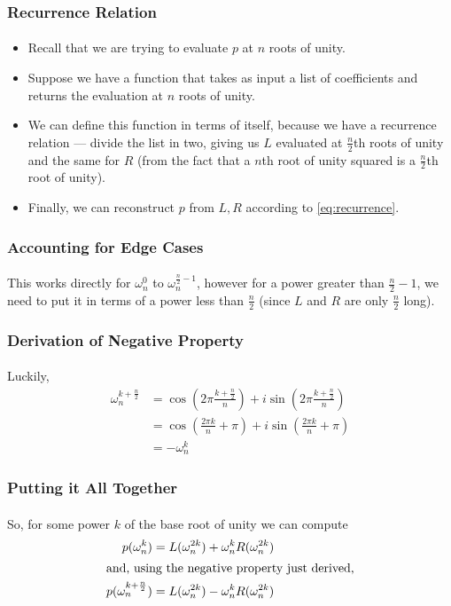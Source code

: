 \documentclass{beamer}                             %
\begin{document}
\begin{frame}
\frametitle{Recurrence Relation}
\framesubtitle{}
\begin{itemize}[<+->]
  \item Recall that we are trying to evaluate
    \( p \) at \( n \) roots of unity.
  \item Suppose we have a function that takes as input a list of
    coefficients and returns the evaluation at \( n \) roots of unity.
  \item We can define this function in terms of itself, because we
    have a recurrence relation --- divide the list in two, giving us
    \( L \) evaluated at \( \frac{n}{2} \)th roots of unity and the
    same for \( R \) (from the fact that a \( n \)th root of unity
    squared is a \( \frac{n}{2} \)th root of unity).
  \item Finally, we can reconstruct \( p \) from
    \( L, R \) according to \eqref{eq:recurrence}.
\end{itemize}
\end{frame}

\begin{frame}
\frametitle{Accounting for Edge Cases}
\framesubtitle{}
This works directly for \( \omega^0_n \) to \( \omega^{\frac{n}{2} - 1}_n \),
however for a power greater than \( \frac{n}{2} - 1 \), we need to put it in
terms of a power less than \( \frac{n}{2} \) (since \( L \) and \( R \) are
only \( \frac{n}{2} \) long).
\end{frame}

\begin{frame}
\frametitle{Derivation of Negative Property}
\framesubtitle{}
Luckily, 
\begin{align*}
  \omega^{k + \frac{n}{2}}_n &= \cos(2 \pi \frac{k + \frac{n}{2}}{n}) +
  i \sin(2 \pi \frac{k + \frac{n}{2}}{n}) \\
                             &= \cos(\frac{2 \pi k}{n} + \pi) +
                             i \sin(\frac{2 \pi k}{n} + \pi) \\
                             &= -\omega_n^k
\end{align*}
\end{frame}

\begin{frame}
\frametitle{Putting it All Together}
\framesubtitle{}
So, for some power \( k \) of the base root of unity we can compute
\begin{align*}
  p(\omega^k_n) &= L(\omega^{2k}_n) + \omega^k_n R(\omega^{2k}_n) \\
  \shortintertext{and, using the negative property just derived,}
  p(\omega^{k + \frac{n}{2}}_n) &= L(\omega^{2k}_n) - \omega^k_n R(\omega^{2k}_n) \\
\end{align*}
\end{frame}
\end{document}
